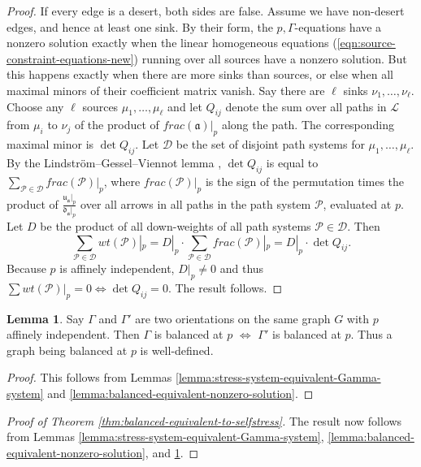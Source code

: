 \documentclass[11pt,letterpaper]{amsart}
\theoremstyle{definition}
\newtheorem{lemma}{Lemma}
\begin{document}
\begin{proof}
    If every edge is a desert, both sides are false. Assume we have non-desert edges, and hence at least one sink. By their form, the $p,\Gamma$-equations have a nonzero solution exactly when the linear homogeneous equations (\ref{eqn:source-constraint-equations-new}) running over all sources have a nonzero solution. But this happens exactly when there are more sinks than sources, or else when all maximal minors of their coefficient matrix vanish. Say there are $\ell$ sinks $\nu_1,\dots,\nu_\ell$. Choose any $\ell$ sources $\mu_1,\dots, \mu_\ell$ and let $Q_{ij}$ denote the sum over all paths in $\mathcal{L}$ from $\mu_i$ to $\nu_j$ of the product of $frac(\mathfrak{a})|_p$ along the path. The corresponding maximal minor is $\det Q_{ij}$. Let $\mathcal{D}$ be the set of disjoint path systems for $\mu_1,\dots,\mu_\ell$. By the Lindstr\"om–Gessel–Viennot lemma \cite{GesselViennot1985, Lindstrom1973}, $\det Q_{ij}$ is equal to $\sum_{\mathcal{P} \in \mathcal{D}} frac(\mathcal{P})|_p$, where $frac(\mathcal{P})|_p$ is the sign of the permutation times the product of $ \frac{\mathfrak{u}_\mathfrak{a}|_p}{ \mathfrak{d}_\mathfrak{a}|_p}$ over all arrows in all paths in the path system $\mathcal{P}$, evaluated at $p$. Let $D$ be the product of all down-weights of all path systems $\mathcal{P} \in \mathcal{D}$. Then
    \begin{equation*}
        \sum_{\mathcal{P} \in \mathcal{D}} wt(\mathcal{P})|_p = D|_p \cdot \sum_{\mathcal{P} \in \mathcal{D}} frac(\mathcal{P})|_p = D|_p \cdot \det Q_{ij}.
    \end{equation*}
    Because $p$ is affinely independent, $D|_p \neq 0$ and thus $\sum wt(\mathcal{P})|_p = 0 \iff \det Q_{ij} = 0$. The result follows.
\end{proof}

\begin{lemma}\label{lemma:Gamma-equivalent-to-Gamma'}
    Say $\Gamma$ and $\Gamma'$ are two orientations on the same graph $G$ with $p$ affinely independent. Then $\Gamma$ is balanced at $p$ $\iff$ $\Gamma'$ is balanced at $p$. Thus a graph being balanced at $p$ is well-defined.
\end{lemma}

\begin{proof}
    This follows from Lemmas \ref{lemma:stress-system-equivalent-Gamma-system} and \ref{lemma:balanced-equivalent-nonzero-solution}.
\end{proof}


\begin{proof}[Proof of Theorem \ref{thm:balanced-equivalent-to-selfstress}]
The result now follows from Lemmas \ref{lemma:stress-system-equivalent-Gamma-system}, \ref{lemma:balanced-equivalent-nonzero-solution}, and \ref{lemma:Gamma-equivalent-to-Gamma'}.
\end{proof}
\end{document}
